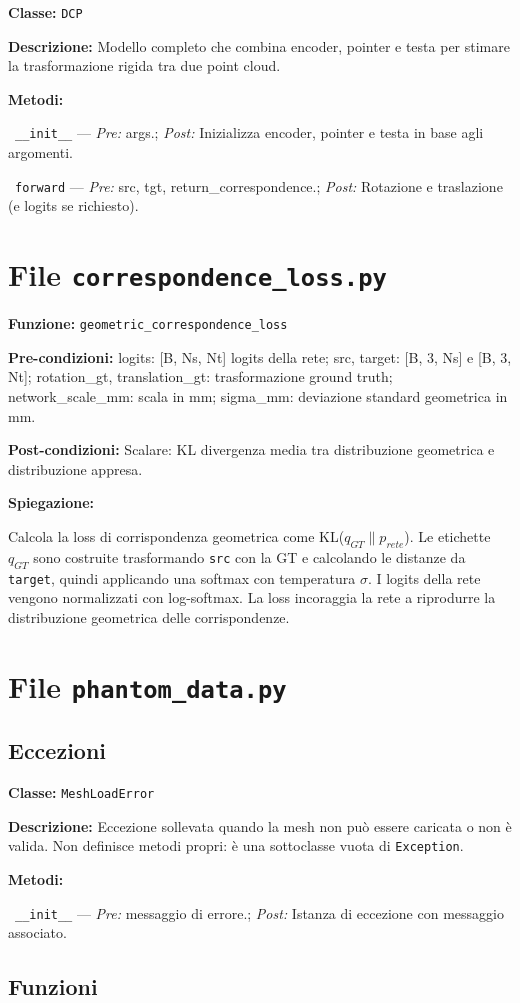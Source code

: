 \documentclass[11pt,a4paper]{article}
\newenvironment{functionspec}[3]{%
    \par\medskip\noindent
    \textbf{Funzione:} \texttt{#1}\par
    \textbf{Pre-condizioni:} #2\par
    \textbf{Post-condizioni:} #3\par
    \textbf{Spiegazione:}\par\noindent\ignorespaces
}{%
    \par\medskip
}
\newenvironment{classspec}[2]{%
    \par\medskip\noindent
    \textbf{Classe:} \texttt{#1}\par
    \textbf{Descrizione:} #2\par
    \textbf{Metodi:}\par
    \begingroup
    \setlength{\parindent}{0pt}%
    \setlength{\parskip}{2pt}%
}{%
    \endgroup
    \par\medskip
}
\newcommand{\method}[3]{%
    \noindent\hspace*{1.2em}\textbullet~\texttt{#1} --- \textit{Pre:} #2; \textit{Post:} #3\par
}
\begin{document}
\begin{classspec}{DCP}{Modello completo che combina encoder, pointer e testa per stimare la trasformazione rigida tra due point cloud.}
\method{\_\_init\_\_}{args.}{Inizializza encoder, pointer e testa in base agli argomenti.}
\method{forward}{src, tgt, return\_correspondence.}{Rotazione e traslazione (e logits se richiesto).}
\end{classspec}

\section{File \texttt{correspondence\_loss.py}}

\begin{functionspec}{geometric\_correspondence\_loss}{logits: [B, Ns, Nt] logits della rete; src, target: [B, 3, Ns] e [B, 3, Nt]; rotation\_gt, translation\_gt: trasformazione ground truth; network\_scale\_mm: scala in mm; sigma\_mm: deviazione standard geometrica in mm.}{Scalare: KL divergenza media tra distribuzione geometrica e distribuzione appresa.}
Calcola la loss di corrispondenza geometrica come KL(\(q_{GT} \| p_{rete}\)). Le etichette \(q_{GT}\) sono costruite trasformando \texttt{src} con la GT e calcolando le distanze da \texttt{target}, quindi applicando una softmax con temperatura \(\sigma\). I logits della rete vengono normalizzati con log-softmax. La loss incoraggia la rete a riprodurre la distribuzione geometrica delle corrispondenze.
\end{functionspec}

\section{File \texttt{phantom\_data.py}}

\subsection{Eccezioni}

\begin{classspec}{MeshLoadError}{Eccezione sollevata quando la mesh non può essere caricata o non è valida. Non definisce metodi propri: è una sottoclasse vuota di \texttt{Exception}.}
\method{\_\_init\_\_}{messaggio di errore.}{Istanza di eccezione con messaggio associato.}
\end{classspec}

\subsection{Funzioni}
\end{document}
